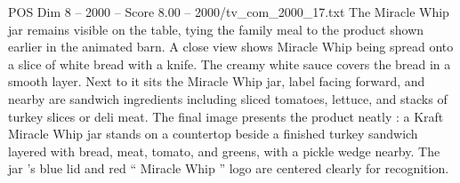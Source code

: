 \begin{textsample}{POS Dim 8 – 2000 – Score 8.00 – 2000/tv\_com\_2000\_17.txt}
The Miracle Whip jar remains visible on the table, tying the family meal to the product shown earlier in the animated barn.
A close view shows Miracle Whip being spread onto a slice of white bread with a knife.
The creamy white sauce covers the bread in a smooth layer.
Next to it sits the Miracle Whip jar, label facing forward, and nearby are sandwich ingredients including sliced tomatoes, lettuce, and stacks of turkey slices or deli meat.
The final image presents the product neatly : a Kraft Miracle Whip jar stands on a countertop beside a finished turkey sandwich layered with bread, meat, tomato, and greens, with a pickle wedge nearby.
The jar ’s blue lid and red “ Miracle Whip ” logo are centered clearly for recognition.

\end{textsample}
